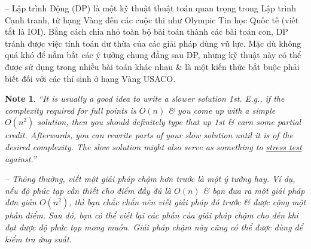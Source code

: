 \documentclass{article}
\newtheorem{note}{Note}
\begin{document}
-- Lập trình Động (DP) là một kỹ thuật thuật toán quan trọng trong Lập trình Cạnh tranh, từ hạng Vàng đến các cuộc thi như Olympic Tin học Quốc tế (viết tắt là IOI). Bằng cách chia nhỏ toàn bộ bài toán thành các bài toán con, DP tránh được việc tính toán dư thừa của các giải pháp dùng vũ lực. Mặc dù không quá khó để nắm bắt các ý tưởng chung đằng sau DP, nhưng kỹ thuật này có thể được sử dụng trong nhiều bài toán khác nhau \& là một kiến thức bắt buộc phải biết đối với các thí sinh ở hạng Vàng USACO.

\begin{note}
    ``It is usually a good idea to write a slower solution 1st. E.g., if the complexity required for full points is $O(n)$ \& you come up with a simple $O(n^2)$ solution, then you should definitely type that up 1st \& earn some partial credit. Afterwards, you can rewrite parts of your slow solution until it is of the desired complexity. The slow solution might also serve as something to \href{https://usaco.guide/general/basic-debugging#stress-testing}{stress test} against.''

    -- Thông thường, viết một giải pháp chậm hơn trước là một ý tưởng hay. Ví dụ, nếu độ phức tạp cần thiết cho điểm đầy đủ là $O(n)$ \& bạn đưa ra một giải pháp đơn giản $O(n^2)$, thì bạn chắc chắn nên viết giải pháp đó trước \& được cộng một phần điểm. Sau đó, bạn có thể viết lại các phần của giải pháp chậm cho đến khi đạt được độ phức tạp mong muốn. Giải pháp chậm này cũng có thể được dùng để kiểm tra ứng suất.
\end{note}
\end{document}
